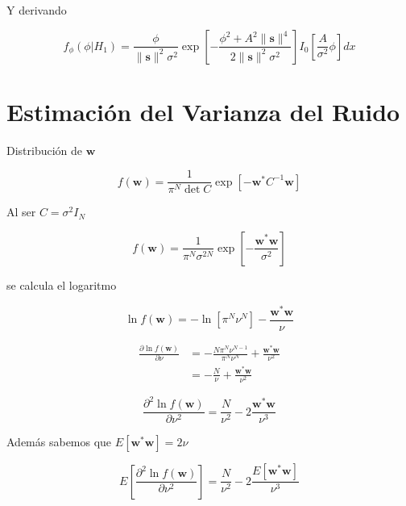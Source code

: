 Y derivando

\begin{equation}
    f_\phi(\phi|H_1) = \frac{\phi}{\lVert\mathbf{s}\rVert^2\sigma^2} \exp\left[-\frac{\phi^2 + A^2\lVert\mathbf{s}\rVert^4}{2\lVert\mathbf{s}\rVert^2\sigma^2}\right]I_0\left[\frac{A}{\sigma^2}\phi\right] dx
\end{equation}

\section{Estimación del Varianza del Ruido}

Distribución de $\mathbf{w}$

\begin{equation}
    f(\mathbf{w}) = \frac{1}{\pi^N \det C} \exp\left[- \mathbf{w}^\ast C^{-1} \mathbf{w}\right]
\end{equation}

Al ser $C = \sigma^2 I_N$

\begin{equation}
    f(\mathbf{w}) = \frac{1}{\pi^N \sigma^{2N}} \exp\left[- \frac{\mathbf{w}^\ast \mathbf{w}}{\sigma^2}\right]
\end{equation}

se calcula el logaritmo

\begin{equation}
    \ln f(\mathbf{w}) = - \ln \left[\pi^N \nu^{N}\right] - \frac{\mathbf{w}^\ast \mathbf{w}}{\nu}
\end{equation}

\begin{equation}
    \begin{aligned}
    \frac{\partial \ln f(\mathbf{w})}{\partial \nu} &= - \frac{N\pi^N\nu^{N-1}}{\pi^N \nu^{N}} + \frac{\mathbf{w}^\ast \mathbf{w}}{\nu^2}\\
    &= - \frac{N}{\nu} + \frac{\mathbf{w}^\ast \mathbf{w}}{\nu^2}
    \end{aligned}
\end{equation}

\begin{equation}
    \frac{\partial^2 \ln f(\mathbf{w})}{\partial \nu^2} =  \frac{N}{\nu^2} - 2  \frac{\mathbf{w}^\ast \mathbf{w}}{\nu^3}
\end{equation}

Además sabemos que $E[\mathbf{w}^\ast\mathbf{w}] = 2\nu$

\begin{equation}
    E\left[\frac{\partial^2 \ln f(\mathbf{w})}{\partial \nu^2}\right] =  \frac{N}{\nu^2} - 2  \frac{E\left[\mathbf{w}^\ast \mathbf{w}\right]}{\nu^3}
\end{equation}

